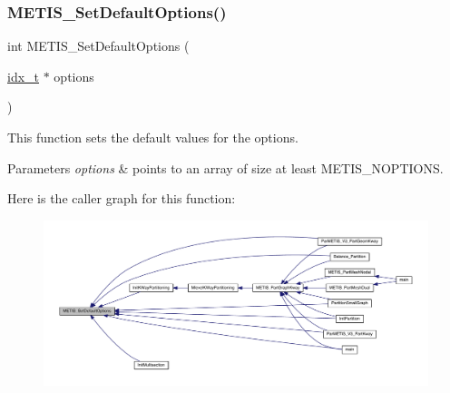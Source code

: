 \subsubsection{\texorpdfstring{M\+E\+T\+I\+S\+\_\+\+Set\+Default\+Options()}{METIS\_SetDefaultOptions()}}
{\footnotesize\ttfamily int M\+E\+T\+I\+S\+\_\+\+Set\+Default\+Options (\begin{DoxyParamCaption}\item[{\hyperlink{a00876_aaa5262be3e700770163401acb0150f52}{idx\+\_\+t} $\ast$}]{options }\end{DoxyParamCaption})}

This function sets the default values for the options.


\begin{DoxyParams}{Parameters}
{\em options} & points to an array of size at least M\+E\+T\+I\+S\+\_\+\+N\+O\+P\+T\+I\+O\+NS. \\
\hline
\end{DoxyParams}
Here is the caller graph for this function\+:\nopagebreak
\begin{figure}[H]
\begin{center}
\leavevmode
\includegraphics[width=350pt]{a00170_abea67bb0c6286795ac5fc9bee605dc5d_icgraph}
\end{center}
\end{figure}
